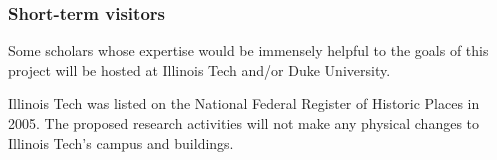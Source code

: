 \documentclass[11pt]{NSFamsart}
\begin{document}
\subsubsection*{Short-term visitors} Some scholars whose expertise would be immensely helpful to the goals of this project will be hosted at Illinois Tech and/or Duke University.

\bigskip \bigskip

Illinois Tech was listed on the National Federal Register of Historic Places in 2005. The proposed 
research activities will not make any physical changes to Illinois Tech's campus and buildings.
\end{document}
